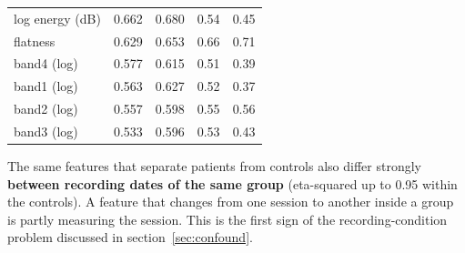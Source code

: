 \documentclass[11pt,a4paper]{article}
\begin{document}
\begin{center}
\begin{longtable}{>{\raggedright\arraybackslash}p{2.88cm}>{\raggedleft\arraybackslash}p{2.88cm}>{\raggedleft\arraybackslash}p{2.88cm}>{\raggedleft\arraybackslash}p{2.88cm}>{\raggedleft\arraybackslash}p{2.88cm}}
\hspace{0pt}log energy (dB) & \hspace{0pt}0.662 & \hspace{0pt}0.680 & \hspace{0pt}0.54 & \hspace{0pt}0.45\\
\hspace{0pt}flatness & \hspace{0pt}0.629 & \hspace{0pt}0.653 & \hspace{0pt}0.66 & \hspace{0pt}0.71\\
\hspace{0pt}band4 (log) & \hspace{0pt}0.577 & \hspace{0pt}0.615 & \hspace{0pt}0.51 & \hspace{0pt}0.39\\
\hspace{0pt}band1 (log) & \hspace{0pt}0.563 & \hspace{0pt}0.627 & \hspace{0pt}0.52 & \hspace{0pt}0.37\\
\hspace{0pt}band2 (log) & \hspace{0pt}0.557 & \hspace{0pt}0.598 & \hspace{0pt}0.55 & \hspace{0pt}0.56\\
\hspace{0pt}band3 (log) & \hspace{0pt}0.533 & \hspace{0pt}0.596 & \hspace{0pt}0.53 & \hspace{0pt}0.43\\
\end{longtable}\end{center}
\begin{tcolorbox}[colback=orange!5,colframe=orange!70!black,boxrule=0.5pt,arc=2pt,left=5pt,right=5pt,top=3pt,bottom=3pt,title={\small\bfseries Key point}]\small The same features that separate patients from controls also differ strongly \textbf{between recording dates of the same group} (eta-squared up to 0.95 within the controls). A feature that changes from one session to another inside a group is partly measuring the session. This is the first sign of the recording-condition problem discussed in section~\ref{sec:confound}.\end{tcolorbox}
\end{document}

